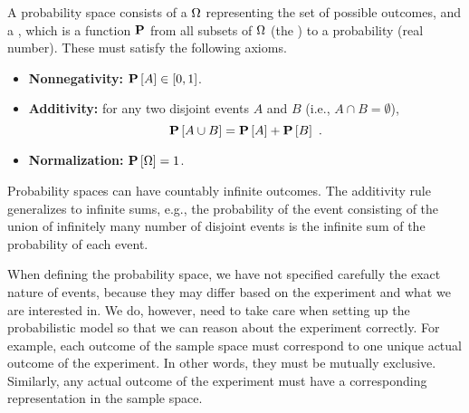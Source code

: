 \begin{flex}





\begin{definition}
\label{def:probability::theory::probability-space}

 A probability space consists of a  $\Omega{}$
 representing the set of possible outcomes, and a , which is a function $\mathbf{P}$ from all subsets of
 $\Omega{}$ (the ) to a probability (real number).
 These must satisfy the following axioms.

\begin{itemize}
\item \textbf{Nonnegativity:} $\mathbf{P}\left[{A}\right] \in [0,1]$.

\item \textbf{Additivity:} for any two disjoint events $A$ and $B$
  (i.e., $A \cap B = \emptyset$), \[\mathbf{P}\left[{A \cup B}\right] =
  \mathbf{P}\left[{A}\right] + \mathbf{P}\left[{B}\right]~.\]

\item \textbf{Normalization:} $\mathbf{P}\left[{\Omega}\right] = 1$.
\end{itemize}
\end{definition}

\begin{note}
Probability spaces can have countably infinite outcomes.  
%
The additivity rule generalizes to infinite sums, e.g., the probability of the event consisting of the union of infinitely many number of disjoint events is the infinite sum of the probability of each event. 
\end{note}

\begin{note}
When defining the probability space, we have not specified
carefully the exact nature of events, because they
may differ based on the experiment and what we are interested in.
%
We do, however, need to take care when setting up the probabilistic model so that we can  reason about the experiment correctly. 
%
For example, each outcome of the sample space must correspond to one
unique actual outcome of the experiment.  In other words, they must be
mutually exclusive. 
%
Similarly, any actual outcome of the experiment must have a
corresponding representation in the sample space.
\end{note}
\end{flex}

